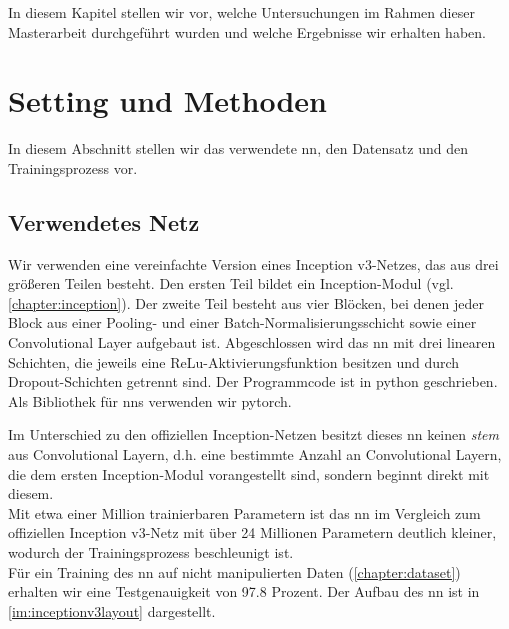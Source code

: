 \documentclass[twoside, 12pt,a4paper]{book}
\numberwithin{equation}{section}
\begin{document}
	In diesem Kapitel stellen wir vor, welche Untersuchungen im Rahmen dieser Masterarbeit durchgeführt wurden und welche Ergebnisse wir erhalten haben.
		
	\section{Setting und Methoden}
	In diesem Abschnitt stellen wir das verwendete \ac{nn}, den Datensatz und den Trainingsprozess vor.
	
	\subsection{Verwendetes Netz}
	Wir verwenden eine vereinfachte Version eines Inception v3-Netzes, das aus drei größeren Teilen besteht. Den ersten Teil bildet ein Inception-Modul (vgl. \autoref{chapter:inception}). Der zweite Teil besteht aus vier Blöcken, bei denen jeder Block aus einer Pooling- und einer Batch-Normalisierungsschicht sowie einer Convolutional Layer aufgebaut ist. Abgeschlossen wird das \ac{nn} mit drei linearen Schichten, die jeweils eine ReLu-Aktivierungsfunktion besitzen und durch Dropout-Schichten getrennt sind. Der Programmcode ist in python geschrieben. Als Bibliothek für \acp{nn} verwenden wir pytorch.
	  
	\noindent Im Unterschied zu den offiziellen Inception-Netzen besitzt dieses \ac{nn} keinen \textit{stem} aus Convolutional Layern, d.h. eine bestimmte Anzahl an Convolutional Layern, die dem ersten Inception-Modul vorangestellt sind, sondern beginnt direkt mit diesem.\\
		
	\noindent Mit etwa einer Million trainierbaren Parametern ist das \ac{nn} im Vergleich zum offiziellen Inception v3-Netz mit über 24 Millionen Parametern deutlich kleiner, wodurch der Trainingsprozess beschleunigt ist.\\
	\noindent Für ein Training des \ac{nn} auf nicht manipulierten Daten (\autoref{chapter:dataset}) erhalten wir eine Testgenauigkeit von 97.8 Prozent. Der Aufbau des \ac{nn} ist in \autoref{im:inceptionv3layout} dargestellt.
	
\end{document}
